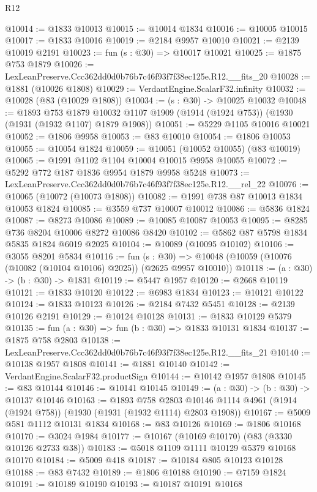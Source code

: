 \begin{lexlean}{R12}
\begin{coremodule}
@10014 := @1833 @10013
@10015 := @10014 @1834
@10016 := @10005 @10015
@10017 := @1833 @10016
@10019 := @2184 @9957 @10010
@10021 := @2139 @10019 @2191
@10023 := fun (s : @30) => @10017 @10021
@10025 := @1875 @753 @1879
@10026 := LexLeanPreserve.Ccc362dd0d0b76b7c46f93f7f38ec125e.R12.__fits_20
@10028 := @1881 (@10026 @1808)
@10029 := VerdantEngine.ScalarF32.infinity
@10032 := @10028 (@83 (@10029 @1808))
@10034 := (s : @30) -> @10025 @10032
@10048 := @1893
    @753
    @1879
    @10032
    @1107
    @1909
    (@1914 (@1924 @753))
    (@1930 (@1931 (@1932 @1107) @1879 @1908))
@10051 := @5229 @1105 @10016 @10021
@10052 := @1806 @9958
@10053 := @83 @10010
@10054 := @1806 @10053
@10055 := @10054 @1824
@10059 := @10051 (@10052 @10055) (@83 @10019)
@10065 := @1991 @1102 @1104 @10004 @10015 @9958 @10055
@10072 := @5292 @772 @187 @1836 @9954 @1879 @9958 @5248
@10073 := LexLeanPreserve.Ccc362dd0d0b76b7c46f93f7f38ec125e.R12.__rel_22
@10076 := @10065 (@10072 (@10073 @1808))
@10082 := @1991 @738 @87 @10013 @1834 @10053 @1824
@10085 := @3559 @737 @10007 @10012
@10086 := @5836 @1824
@10087 := @8273 @10086
@10089 := @10085 @10087 @10053
@10095 := @8285 @736 @8204 @10006 @8272 @10086 @8420
@10102 := @5862 @87 @5798 @1834 @5835 @1824 @6019 @2025
@10104 := @10089 (@10095 @10102)
@10106 := @3055 @8201 @5834
@10116 := fun (s : @30) =>
  @10048 (@10059 (@10076 (@10082 (@10104 @10106) @2025)) (@2625 @9957 @10010))
@10118 := (a : @30) -> (b : @30) -> @1831
@10119 := @5447 @1957
@10120 := @2668 @10119
@10121 := @1833 @10120
@10122 := @6983 @1834
@10123 := @10121 @10122
@10124 := @1833 @10123
@10126 := @2184 @7432 @5451
@10128 := @2139 @10126 @2191
@10129 := @10124 @10128
@10131 := @1833 @10129 @5379
@10135 := fun (a : @30) => fun (b : @30) => @1833 @10131 @1834
@10137 := @1875 @758 @2803
@10138 := LexLeanPreserve.Ccc362dd0d0b76b7c46f93f7f38ec125e.R12.__fits_21
@10140 := @10138 @1957 @1808
@10141 := @1881 @10140
@10142 := VerdantEngine.ScalarF32.productSign
@10144 := @10142 @1957 @1808
@10145 := @83 @10144
@10146 := @10141 @10145
@10149 := (a : @30) -> (b : @30) -> @10137 @10146
@10163 := @1893
    @758
    @2803
    @10146
    @1114
    @4961
    (@1914 (@1924 @758))
    (@1930 (@1931 (@1932 @1114) @2803 @1908))
@10167 := @5009 @581 @1112 @10131 @1834
@10168 := @83 @10126
@10169 := @1806 @10168
@10170 := @3024 @1984
@10177 := @10167 (@10169 @10170) (@83 (@3330 @10126 @2733 @38))
@10183 := @5018 @1109 @1111 @10129 @5379 @10168 @10170
@10184 := @5009 @418
@10187 := @10184 @805 @10123 @10128
@10188 := @83 @7432
@10189 := @1806 @10188
@10190 := @7159 @1824
@10191 := @10189 @10190
@10193 := @10187 @10191 @10168

\end{coremodule}
\end{lexlean}
